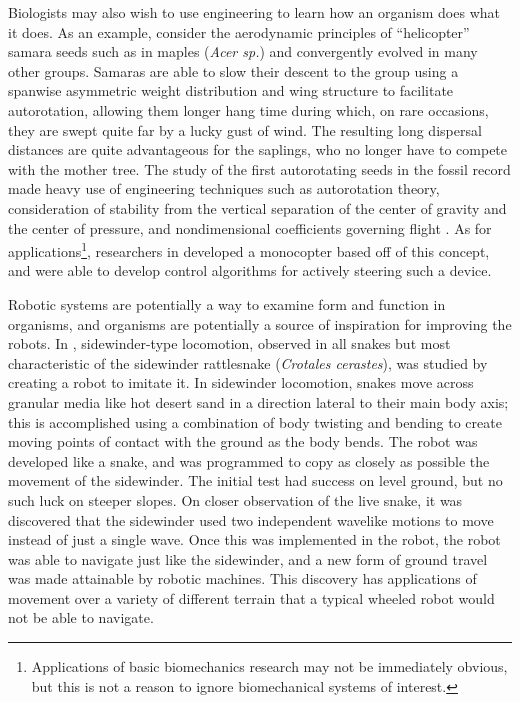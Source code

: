 \documentclass[onecolumn,10pt]{IEEEtran}
\begin{document}
Biologists may also wish to use engineering to learn how an organism does what it does.  As an example, consider the aerodynamic principles of ``helicopter'' samara seeds such as in maples (\emph{Acer sp.}) and convergently evolved in many other groups.  Samaras are able to slow their descent to the group using a spanwise asymmetric weight distribution and wing structure to facilitate autorotation, allowing them longer hang time during which, on rare occasions, they are swept quite far by a lucky gust of wind. The resulting long dispersal distances are quite advantageous for the saplings, who no longer have to compete with the mother tree. The study of the first autorotating seeds in the fossil record made heavy use of engineering techniques such as autorotation theory, consideration of stability from the vertical separation of the center of gravity and the center of pressure, and nondimensional coefficients governing flight \cite{stevenson2015when}.  As for applications\footnote{Applications of basic biomechanics research may not be immediately obvious, but this is not a reason to ignore biomechanical systems of interest.}, researchers in \cite{who2019maple} developed a monocopter based off of this concept, and were able to develop control algorithms for actively steering such a device. 

Robotic systems are potentially a way to examine form and function in organisms, and organisms are potentially a source of inspiration for improving the robots.  In \cite{feltman2014creepy}, sidewinder-type locomotion, observed in all snakes but most characteristic of the sidewinder rattlesnake (\emph{Crotales cerastes}), was studied by creating a robot to imitate it. In sidewinder locomotion, snakes move across granular media like hot desert sand in a direction lateral to their main body axis; this is accomplished using a combination of body twisting and bending to create moving points of contact with the ground as the body bends.  The robot was developed like a snake, and was programmed to copy as closely as possible the movement of the sidewinder. The initial test had success on level ground, but no such luck on steeper slopes. On closer observation of the live snake, it was discovered that the sidewinder used two independent wavelike motions to move instead of just a single wave. Once this was implemented in the robot, the robot was able to navigate just like the sidewinder, and a new form of ground travel was made attainable by robotic machines. This discovery has applications of movement over a variety of different terrain that a typical wheeled robot would not be able to navigate.
\end{document}

